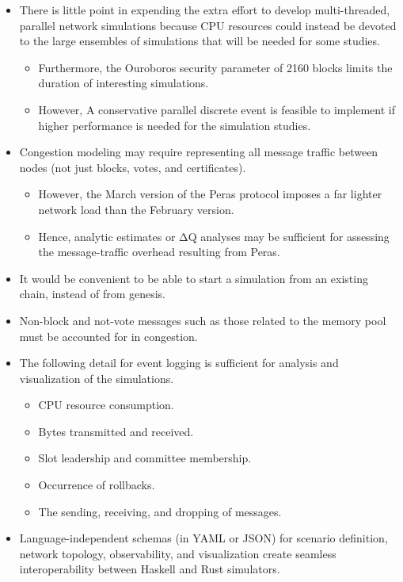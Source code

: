 \documentclass[10pt]{article}
\providecommand{\tightlist}{%
  \setlength{\itemsep}{0pt}\setlength{\parskip}{0pt}}
\begin{document}
\begin{itemize}
\tightlist
\item
  There is little point in expending the extra effort to develop
  multi-threaded, parallel network simulations because CPU resources
  could instead be devoted to the large ensembles of simulations that
  will be needed for some studies.

  \begin{itemize}
  \tightlist
  \item
    Furthermore, the Ouroboros security parameter of 2160 blocks limits
    the duration of interesting simulations.
  \item
    However, A conservative parallel discrete event is feasible to
    implement if higher performance is needed for the simulation
    studies.
  \end{itemize}
\item
  Congestion modeling may require representing all message traffic
  between nodes (not just blocks, votes, and certificates).

  \begin{itemize}
  \tightlist
  \item
    However, the March version of the Peras protocol imposes a far
    lighter network load than the February version.
  \item
    Hence, analytic estimates or ΔQ analyses may be sufficient for
    assessing the message-traffic overhead resulting from Peras.
  \end{itemize}
\item
  It would be convenient to be able to start a simulation from an
  existing chain, instead of from genesis.
\item
  Non-block and not-vote messages such as those related to the memory
  pool must be accounted for in congestion.
\item
  The following detail for event logging is sufficient for analysis and
  visualization of the simulations.

  \begin{itemize}
  \tightlist
  \item
    CPU resource consumption.
  \item
    Bytes transmitted and received.
  \item
    Slot leadership and committee membership.
  \item
    Occurrence of rollbacks.
  \item
    The sending, receiving, and dropping of messages.
  \end{itemize}
\item
  Language-independent schemas (in YAML or JSON) for scenario
  definition, network topology, observability, and visualization create
  seamless interoperability between Haskell and Rust simulators.


\end{itemize}
\end{document}
